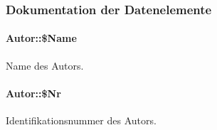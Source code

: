 \subsubsection{Dokumentation der Datenelemente}
\hypertarget{classAutor_8602b5705cef83e7c16f4040f9add56d}{
\paragraph[\$Name]{\setlength{\rightskip}{0pt plus 5cm}Autor::\$Name}\hfill}
\label{classAutor_8602b5705cef83e7c16f4040f9add56d}


Name des Autors. 

\hypertarget{classAutor_23e64634d5dc31b41b7ee9c49b9ea6b9}{
\paragraph[\$Nr]{\setlength{\rightskip}{0pt plus 5cm}Autor::\$Nr}\hfill}
\label{classAutor_23e64634d5dc31b41b7ee9c49b9ea6b9}


Identifikationsnummer des Autors. 


